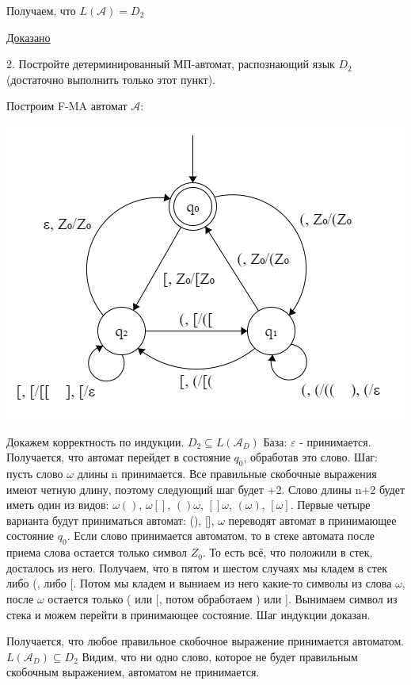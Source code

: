 \documentclass[a4paper,14pt]{article} %
\begin{document}
Получаем, что $L(\mathcal{A}) = D_2$

\underline{Доказано}

2. Постройте детерминированный МП-автомат, распознающий язык $D_2$ (достаточно выполнить только этот пункт).

Построим F-MA автомат $\mathcal{A}$:

\begin{center}
\includegraphics{02.png}
\end{center}

Докажем корректность по индукции.
$D_2 \subseteq L(\mathcal{A}_D)$
\newline
База: $\varepsilon$ - принимается. Получается, что автомат перейдет в состояние $q_0$, обработав это слово.
\newline
Шаг: пусть слово $\omega$ длины n принимается. Все правильные скобочные выражения имеют четную длину, поэтому следующий шаг будет +2.
Слово длины n+2 будет иметь один из видов: $\omega()$, $\omega[]$, $()\omega$, $[]\omega$, $(\omega)$, $[\omega]$.
Первые четыре варианта будут приниматься автомат: (), [], $\omega$ переводят автомат в принимающее состояние $q_0$.
Если слово принимается автоматом, то в стеке автомата после приема слова остается только символ $Z_0$. То есть всё, что положили в стек, досталось из него. Получаем, что в пятом и шестом случаях мы кладем в стек либо (, либо [. Потом мы кладем и выниаем из него какие-то символы из слова $\omega$, после $\omega$ остается только ( или [, потом обработаем ) или ]. Вынимаем символ из стека и можем перейти в принимающее состояние.
\newline
Шаг индукции доказан.

Получается, что любое правильное скобочное выражение принимается автоматом.
\newline
$L(\mathcal{A}_D) \subseteq D_2$
Видим, что ни одно слово, которое не будет правильным скобочным выражением, автоматом не принимается.
\end{document}
